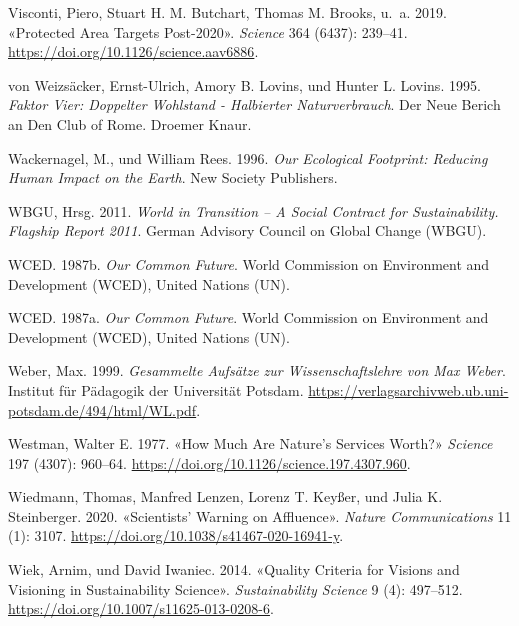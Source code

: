 \documentclass[
  nswissgerman,
  a4paper,
  openany]{book}
\newlength{\cslhangindent}
\newenvironment{CSLReferences}[2] %
 {\begin{list}{}{%
  \setlength{\itemindent}{0pt}
  \setlength{\leftmargin}{0pt}
  \setlength{\parsep}{0pt}
  \ifodd #1
   \setlength{\leftmargin}{\cslhangindent}
   \setlength{\itemindent}{-1\cslhangindent}
  \fi
  \setlength{\itemsep}{#2\baselineskip}}}
 {\end{list}}
\begin{document}
\begin{CSLReferences}{1}{1}
Visconti, Piero, Stuart H. M. Butchart, Thomas M. Brooks, u.~a. 2019.
{«Protected Area Targets Post-2020»}. \emph{Science} 364 (6437):
239--41. \url{https://doi.org/10.1126/science.aav6886}.

{von Weizsäcker, Ernst-Ulrich, Amory B. Lovins, und Hunter L. Lovins}.
1995. \emph{Faktor {Vier}: {Doppelter Wohlstand} - Halbierter
{Naturverbrauch}}. Der Neue {Berich} an Den {Club} of {Rome}. Droemer
Knaur.

Wackernagel, M., und William Rees. 1996. \emph{Our {Ecological
Footprint}: {Reducing Human Impact} on the {Earth}}. New Society
Publishers.

WBGU, Hrsg. 2011. \emph{World in {Transition} -- {A} {Social} {Contract}
for {Sustainability}. {Flagship} {Report} 2011}. German Advisory Council
on Global Change (WBGU).

WCED. 1987b. \emph{Our {Common Future}}. {World Commission on
Environment and Development (WCED), United Nations (UN)}.

WCED. 1987a. \emph{Our {Common Future}}. {World Commission on
Environment and Development (WCED), United Nations (UN)}.

Weber, Max. 1999. \emph{Gesammelte {Aufsätze} zur {Wissenschaftslehre}
von {Max} {Weber}}. Institut für Pädagogik der Universität Potsdam.
\url{https://verlagsarchivweb.ub.uni-potsdam.de/494/html/WL.pdf}.

Westman, Walter E. 1977. {«How {Much Are Nature}'s {Services Worth}?»}
\emph{Science} 197 (4307): 960--64.
\url{https://doi.org/10.1126/science.197.4307.960}.

Wiedmann, Thomas, Manfred Lenzen, Lorenz T. Keyßer, und Julia K.
Steinberger. 2020. {«Scientists' Warning on Affluence»}. \emph{Nature
Communications} 11 (1): 3107.
\url{https://doi.org/10.1038/s41467-020-16941-y}.

Wiek, Arnim, und David Iwaniec. 2014. {«Quality Criteria for Visions and
Visioning in Sustainability Science»}. \emph{Sustainability Science} 9
(4): 497--512. \url{https://doi.org/10.1007/s11625-013-0208-6}.


\end{CSLReferences}
\end{document}
